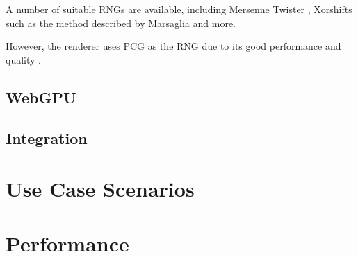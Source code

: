 A number of suitable RNGs are available, including Mersenne Twister \cite{rngMersenneTwister}, Xorshifts such as the method described by Marsaglia \cite{marsaglia2003xorshift} and more.

However, the renderer uses PCG as the RNG due to its good performance and quality \cite{o2014pcg}.

\subsection{WebGPU}
\subsection{Integration}
\section{Use Case Scenarios}
\section{Performance}